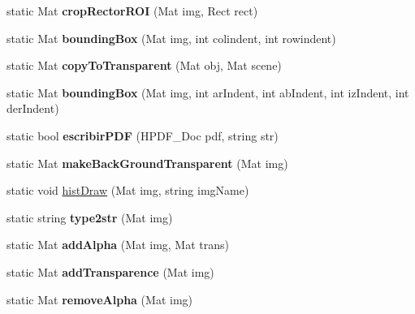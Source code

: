 \begin{DoxyCompactItemize}
\item 
\mbox{\label{classCommonFunctions_a59211fa9ca611fd09496f4e376649ab2}} 
static Mat {\bfseries crop\+Rector\+R\+OI} (Mat img, Rect rect)
\item 
\mbox{\label{classCommonFunctions_a4a2a24e283f18beb6e217993924759c6}} 
static Mat {\bfseries bounding\+Box} (Mat img, int colindent, int rowindent)
\item 
\mbox{\label{classCommonFunctions_a8cd6fcf506c80ec5bcbc8edd26004cc3}} 
static Mat {\bfseries copy\+To\+Transparent} (Mat obj, Mat scene)
\item 
\mbox{\label{classCommonFunctions_aaeebbb5957d3384fa121e5d231de03ab}} 
static Mat {\bfseries bounding\+Box} (Mat img, int ar\+Indent, int ab\+Indent, int iz\+Indent, int der\+Indent)
\item 
\mbox{\label{classCommonFunctions_a188e7c8fcb797856482ecfd4010c62a9}} 
static bool {\bfseries escribir\+P\+DF} (H\+P\+D\+F\+\_\+\+Doc pdf, string str)
\item 
\mbox{\label{classCommonFunctions_a8e39cb29f27952c6658f69fd9be55ec3}} 
static Mat {\bfseries make\+Back\+Ground\+Transparent} (Mat img)
\item 
static void \mbox{\hyperlink{classCommonFunctions_a7b0e52ec4c30af5244724936f163c2d1}{hist\+Draw}} (Mat img, string img\+Name)
\item 
\mbox{\label{classCommonFunctions_a46eb03d173a7e2ec7459a49a78e40d48}} 
static string {\bfseries type2str} (Mat img)
\item 
\mbox{\label{classCommonFunctions_acede9b6245c18d795b94b7c2261671b1}} 
static Mat {\bfseries add\+Alpha} (Mat img, Mat trans)
\item 
\mbox{\label{classCommonFunctions_a66c8badc3cb8d173aaac77a3acdbec4c}} 
static Mat {\bfseries add\+Transparence} (Mat img)
\item 
\mbox{\label{classCommonFunctions_a511266d1137ccdefb6e7c5d156145831}} 
static Mat {\bfseries remove\+Alpha} (Mat img)
\end{DoxyCompactItemize}


